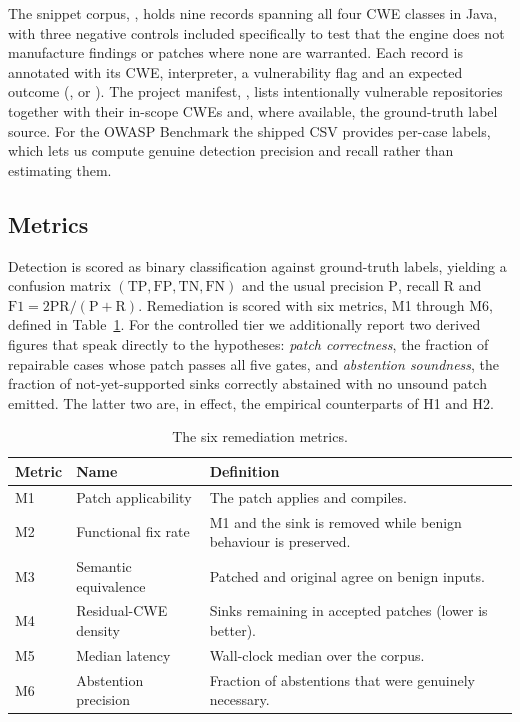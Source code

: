 The snippet corpus, , holds nine
records spanning all four CWE classes in Java, with three negative controls
included specifically to test that the engine does not manufacture findings
or patches where none are warranted. Each record is annotated with its CWE,
interpreter, a vulnerability flag and an expected outcome (,
 or ). The
project manifest, , lists intentionally
vulnerable repositories together with their in-scope CWEs and, where
available, the ground-truth label source. For the OWASP Benchmark the
shipped  CSV provides per-case labels, which lets us
compute genuine detection precision and recall rather than estimating them.

\subsection{Metrics}
\label{sec:metrics}

Detection is scored as binary classification against ground-truth labels,
yielding a confusion matrix $(\mathrm{TP},\mathrm{FP},\mathrm{TN},\mathrm{FN})$
and the usual precision $\mathrm{P}$, recall $\mathrm{R}$ and
$\mathrm{F1}=2\mathrm{PR}/(\mathrm{P}+\mathrm{R})$. Remediation is scored
with six metrics, M1 through M6, defined in Table~\ref{tab:metrics}. For the
controlled tier we additionally report two derived figures that speak
directly to the hypotheses: \emph{patch correctness}, the fraction of
repairable cases whose patch passes all five gates, and \emph{abstention
soundness}, the fraction of not-yet-supported sinks correctly abstained with
no unsound patch emitted. The latter two are, in effect, the empirical
counterparts of H1 and H2.

\begin{table}[ht]
\centering
\caption{The six remediation metrics.}
\label{tab:metrics}
\begin{tabular}{p{1.2cm}p{4.4cm}p{7.2cm}}
\hline
\textbf{Metric} & \textbf{Name} & \textbf{Definition} \\
\hline
M1 & Patch applicability      & The patch applies and compiles. \\
M2 & Functional fix rate      & M1 and the sink is removed while benign
behaviour is preserved. \\
M3 & Semantic equivalence     & Patched and original agree on benign inputs. \\
M4 & Residual-CWE density     & Sinks remaining in accepted patches (lower
is better). \\
M5 & Median latency           & Wall-clock median over the corpus. \\
M6 & Abstention precision     & Fraction of abstentions that were genuinely
necessary. \\
\hline
\end{tabular}
\end{table}

